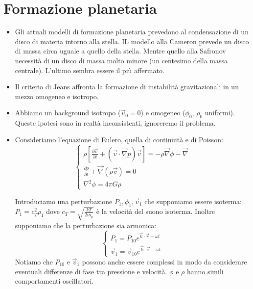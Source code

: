 \documentclass[11pt,a4paper]{article}
\begin{document}
\section{Formazione planetaria}
\begin{itemize}
\item Gli attuali modelli di formazione planetaria prevedono al condensazione di un disco di materia intorno alla stella. IL modello alla Cameron prevede un disco di massa circa uguale a quello della stella. Mentre quello alla Safronov necessità di un disco di massa molto minore (un centesimo della massa centrale). L'ultimo sembra essere il più affermato.

\item Il criterio di Jeans affronta la formazione di instabilità gravitazionali in un mezzo omogeneo e isotropo.

\item  Abbiamo un background isotropo ($\vec{v}_0 = 0$) e omogeneo ($\phi_0$, $\rho_0$ uniformi). Queste ipotesi sono in realtà inconsistenti, ignoreremo il problema.

\item Consideriamo l'equazione di Eulero, quella di continuità e di Poisson:
\begin{equation}
\begin{cases}
\rho \left[ \frac{\partial \vec{v}}{\partial t} + \left( \vec{v} \cdot \vec{\nabla}p \right)  \vec{v} \right] = - \rho \vec{\nabla} \phi - \vec{\nabla} \\
\frac{\partial \rho  }{\partial t} + \vec{\nabla} \left( \rho \vec{v} \right) = 0 \\
\nabla^2 \phi = 4 \pi G \rho
\end{cases}
\end{equation}

Introduciamo una perturbazione $P_1, \phi_1, \vec{v}_1$ che supponiamo essere isoterma: $P_1 = c_T^{2} \rho_1$ dove $c_T = \sqrt{\frac{kT}{2 m_p}}$ è la velocità del suono isoterma. Inoltre supponiamo che la perturbazione sia armonica:
\begin{equation}
\begin{cases}
P_1 = P_{10} e^{\vec{k} \cdot \vec{r} - \omega t}\\
\vec{v}_1 = \vec{v}_{10} e^{\vec{k} \cdot \vec{r} - \omega t}
\end{cases}
\end{equation}
Notiamo che $P_{10}$ e $\vec{v}_1$ possono anche essere complessi in modo da considerare eventuali differenze di fase tra pressione e velocità. $\phi$ e $\rho$ hanno simili comportamenti oscillatori.


\end{itemize}
\end{document}

